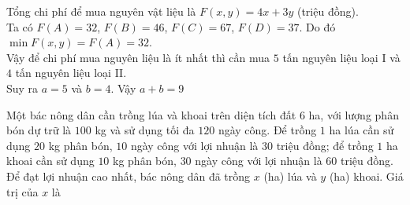\begin{bt}
{\begin{center}
		\end{center}
		Tổng chi phí để mua nguyên vật liệu là $F\left(x,y\right)=4x+3y$ (triệu đồng).\\
		Ta có $F(A)=32$, $F(B)=46$, $F(C)=67$, $F(D)=37$. Do đó $\min F\left(x,y\right)=F(A)=32$.\\
		Vậy để chi phí mua nguyên liệu là ít nhất thì cần mua $ 5$ tấn nguyên liệu loại I và $4$ tấn nguyên liệu loại II.\\
		Suy ra $a=5$ và $b=4$. Vậy $a+b=9$}
\end{bt}

\begin{bt}%
	Một bác nông dân cần trồng lúa và khoai trên diện tích đất $6$ ha, với lượng phân bón dự trữ là $100$ kg và sử dụng tối đa $120$ ngày công. Để trồng $1$ ha lúa cần sử dụng $20$ kg phân bón, $10$ ngày công với lợi nhuận là $30$ triệu đồng; để trồng $1$ ha khoai cần sử dụng $10$ kg phân bón, $30$ ngày công với lợi nhuận là $60$ triệu đồng. Để đạt lợi nhuận cao nhất, bác nông dân đã trồng $x$ (ha) lúa và $y$ (ha) khoai. Giá trị của $x$ là
\end{bt}

